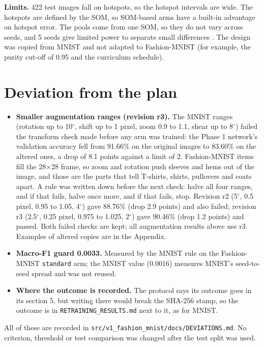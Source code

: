 \documentclass[11pt]{article}
\begin{document}
\textbf{Limits.} 422 test images fall on hotspots, so the hotspot intervals are wide. The hotspots are defined by the SOM, so SOM-based arms have a built-in advantage on hotspot error. The pools come from one SOM, so they do not vary across seeds, and 5 seeds give limited power to separate small differences \parencite{bouthillier2021variance}. The design was copied from MNIST and not adapted to Fashion-MNIST (for example, the purity cut-off of 0.95 and the curriculum schedule).

\section{Deviation from the plan}\label{sec:deviation}

\begin{itemize}[leftmargin=1.4em, itemsep=2pt]
  \item \textbf{Smaller augmentation ranges (revision r3).} The MNIST ranges (rotation up to 10$^\circ$, shift up to 1 pixel, zoom 0.9 to 1.1, shear up to 8$^\circ$) failed the transform check made before any arm was trained: the Phase 1 network's validation accuracy fell from 91.66\% on the original images to 83.60\% on the altered ones, a drop of 8.1 points against a limit of 2. Fashion-MNIST items fill the 28$\times$28 frame, so zoom and rotation push sleeves and hems out of the image, and those are the parts that tell T-shirts, shirts, pullovers and coats apart. A rule was written down before the next check: halve all four ranges, and if that fails, halve once more, and if that fails, stop. Revision r2 (5$^\circ$, 0.5 pixel, 0.95 to 1.05, 4$^\circ$) gave 88.76\% (drop 2.9 points) and also failed; revision r3 (2.5$^\circ$, 0.25 pixel, 0.975 to 1.025, 2$^\circ$) gave 90.46\% (drop 1.2 points) and passed. Both failed checks are kept; all augmentation results above use r3. Examples of altered copies are in the Appendix.
  \item \textbf{Macro-F1 guard 0.0033.} Measured by the MNIST rule on the Fashion-MNIST \texttt{standard} arm; the MNIST value (0.0016) measures MNIST's seed-to-seed spread and was not reused.
  \item \textbf{Where the outcome is recorded.} The protocol says its outcome goes in its section 5, but writing there would break the SHA-256 stamp, so the outcome is in \texttt{RETRAINING\_RESULTS.md} next to it, as for MNIST.
\end{itemize}

All of these are recorded in \texttt{src/v1\_fashion\_mnist/docs/DEVIATIONS.md}. No criterion, threshold or test comparison was changed after the test split was used.
\end{document}
